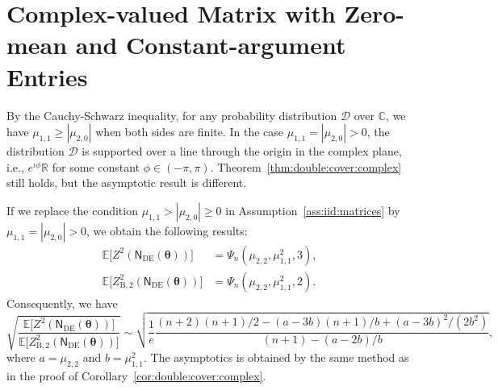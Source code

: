 \documentclass[conference]{IEEEtran}
\theoremstyle{plain}
\theoremstyle{definition}
\providecommand{\R}{\mathbb {R}}
\providecommand{\C}{\mathbb {C}}
\newcommand{\B}{\mathrm{B}}
\newcommand{\E}{\mathbb {E}}
\newcommand{\sfn}{\mathsf{N}}
\newcommand{\btheta}{\boldsymbol{\theta}}
\newcommand{\sfnDE}{\sfn_{\mathrm{DE}}}
\begin{document}
 \section{Complex-valued Matrix with Zero-mean and Constant-argument Entries}
 \label{appx:double:cover:complex:equal}

 By the Cauchy-Schwarz inequality, for any probability distribution $\mathcal D$
 over $\C$, we have $\mu_{1,1}\geq |\mu_{2,0}|$ when both sides are finite. In
 the case $\mu_{1,1}=|\mu_{2,0}|>0$, the distribution $\mathcal D$ is supported
 over a line through the origin in the complex plane, i.e., $e^{\iota \phi}\R$
 for some constant $\phi\in(-\pi,\pi)$. Theorem~\ref{thm:double:cover:complex}
 still holds, but the asymptotic result is different.

 If we replace the condition $\mu_{1,1}>|\mu_{2,0}|\geq0$ in
 Assumption~\ref{ass:iid:matrices} by $\mu_{1,1}=|\mu_{2,0}|>0$, we obtain the
 following results:
 \begin{align*}
  \E \big[Z^2(\sfnDE(\btheta))\big]        & = \Psi_n (\mu_{2,2}, \mu_{1,1}^2, 3), \\
  \E \big[Z_{\B,2}^2(\sfnDE(\btheta))\big] & = \Psi_n (\mu_{2,2}, \mu_{1,1}^2, 2).
 \end{align*}
 Consequently, we have
 \[
  \sqrt{\frac{\E \big[Z^2(\sfnDE(\btheta))\big]}{\E \big[Z_{\B,2}^2(\sfnDE(\btheta))\big]}}\sim
  \sqrt{\frac{1}{e}\frac{(n+2)(n+1)/2-(a-3b)(n+1)/b+(a-3b)^2/(2b^2)}{(n+1)-(a-2b)/b}},
 \]
 where $a=\mu_{2,2}$ and $b=\mu_{1,1}^2$. The asymptotics is obtained by the
 same method as in the proof of Corollary~\ref{cor:double:cover:complex}.

\else
\fi
\end{document}
